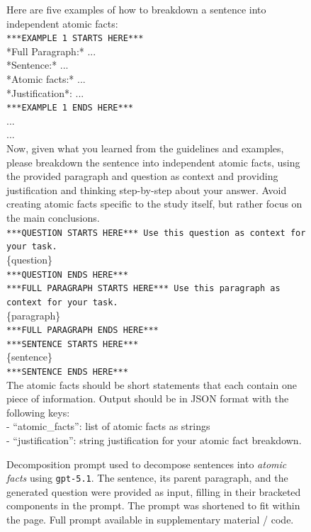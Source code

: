 \documentclass{article}
\begin{document}
\begin{figure}[t]
\begin{small}
\begin{tcolorbox}[
    colback=gray!5,
    colframe=black,
    width=\linewidth,
    arc=2mm,
    boxrule=0.5pt,
    title=\textbf{Atomic Fact Generation (Step 1): Decomposition Prompt}
]
Here are five examples of how to breakdown a sentence into independent atomic facts:\\

\texttt{***EXAMPLE 1 STARTS HERE***}\\
*Full Paragraph:* ...\\
*Sentence:* ...\\
*Atomic facts:* ...\\
*Justification*: ... \\
\texttt{***EXAMPLE 1 ENDS HERE***}\\
... \\
...\\

Now, given what you learned from the guidelines and examples, please breakdown the sentence into independent atomic facts, using the provided paragraph and question as context and providing justification and thinking step-by-step about your answer. Avoid creating atomic facts specific to the study itself, but rather focus on the main conclusions.\\

\texttt{***QUESTION STARTS HERE*** Use this question as context for your task.}\\
\{question\}\\
\texttt{***QUESTION ENDS HERE***}\\

\texttt{***FULL PARAGRAPH STARTS HERE*** Use this paragraph as context for your task.}\\
\{paragraph\}\\
\texttt{***FULL PARAGRAPH ENDS HERE***}\\

\texttt{***SENTENCE STARTS HERE***} \\
\{sentence\} \\ 
\texttt{***SENTENCE ENDS HERE***}\\

The atomic facts should be short statements that each contain one piece of information. Output should be in JSON format with the following keys:\\
- ``atomic\_facts'': list of atomic facts as strings\\
- ``justification'': string justification for your atomic fact breakdown.
\end{tcolorbox}

\caption{Decomposition prompt used to decompose sentences into \textit{atomic facts} using \texttt{gpt-5.1}. The sentence, its parent paragraph, and the generated question were provided as input, filling in their bracketed components in the prompt. The prompt was shortened to fit within the page. Full prompt available in supplementary material / code.}
\label{fig:decomposition-prompt}
\end{small}
\end{figure}
\end{document}

